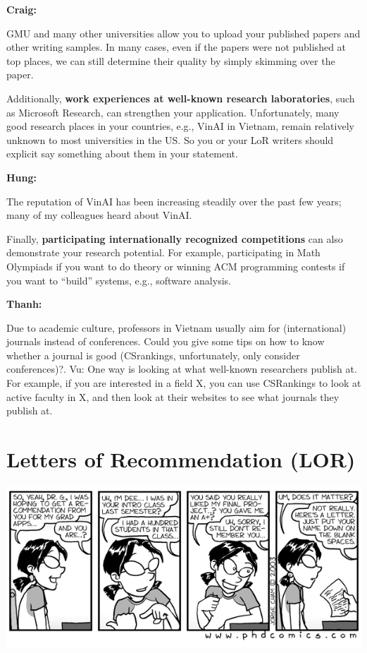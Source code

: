\documentclass[oneside,11pt]{book}
\newenvironment{commentbox}[1][]{
  \small
  \begin{mybox}
    {\small \textbf{#1}}
  }{
  \end{mybox}
}
\begin{document}
\begin{commentbox}[Craig:]
  GMU and many other universities allow you to upload your published papers and other writing samples. In many cases, even if the papers were not published at top places, we can still determine their quality by simply skimming over the paper.
\end{commentbox}

Additionally, \textbf{work experiences at well-known research laboratories}, such as Microsoft Research, can strengthen your
application.  Unfortunately, many good research places in your countries, e.g., VinAI in Vietnam, remain relatively unknown to most universities in the US. So you or your LoR writers should explicit say something about them in your statement.



\begin{commentbox}[Hung:]
  The reputation of VinAI has been increasing steadily over the past few years; many of my colleagues heard about VinAI.
\end{commentbox}

Finally, \textbf{participating internationally recognized competitions} can also demonstrate your research potential.
For example, participating in Math Olympiads if you want to do theory or  winning ACM programming contests if you want to ``build'' systems, e.g., software analysis.

\begin{commentbox}[Thanh:]
  Due to academic culture, professors in Vietnam usually aim for (international) journals instead of conferences. Could you give some tips on how to know whether a journal is good (CSrankings, unfortunately, only consider conferences)?.
  \tcblower
  Vu: One way is looking at what well-known researchers publish at. For example, if you are interested in a field X, you can use CSRankings to look at active faculty in X, and then look at their websites to see what journals they publish at.
\end{commentbox}

\section{Letters of Recommendation (LOR)}\label{sec:lor}

\begin{center}
  \includegraphics[width=0.6\linewidth]{files/c6.png}
\end{center}
\end{document}

